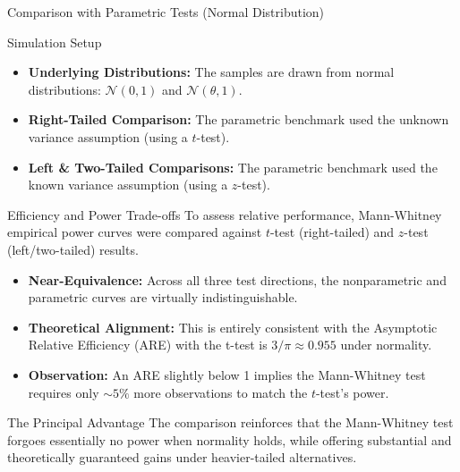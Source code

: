 \documentclass[8pt]{beamer}
\begin{document}
\begin{frame}{Comparison with Parametric Tests (Normal Distribution)}
    \footnotesize
    \begin{block}{Simulation Setup}
    \begin{itemize}
        \item \textbf{Underlying Distributions:} The samples are drawn from normal distributions: $\mathcal{N}(0, 1)$ and $\mathcal{N}(\theta, 1)$.
        \item \textbf{Right-Tailed Comparison:} The parametric benchmark used the unknown variance assumption (using a $t$-test).
        \item \textbf{Left \& Two-Tailed Comparisons:} The parametric benchmark used the known variance assumption (using a $z$-test).
    \end{itemize}
\end{block}
    \begin{block}{Efficiency and Power Trade-offs}
        To assess relative performance, Mann-Whitney empirical power curves were compared against $t$-test (right-tailed) and $z$-test (left/two-tailed) results.
        \begin{itemize}
            \item \textbf{Near-Equivalence:} Across all three test directions, the nonparametric and parametric curves are virtually indistinguishable.
            \item \textbf{Theoretical Alignment:} This is entirely consistent with the Asymptotic Relative Efficiency (ARE) with the t-test is $3/\pi \approx 0.955$ under normality.
            \item \textbf{Observation:} An ARE slightly below 1 implies the Mann-Whitney test requires only $\sim 5\%$ more observations to match the $t$-test's power.
        \end{itemize}
    \end{block}

    \begin{block}{The Principal Advantage}
        The comparison reinforces that the Mann-Whitney test forgoes essentially no power when normality holds, while offering substantial and theoretically guaranteed gains under heavier-tailed alternatives.
    \end{block}
\end{frame}
\end{document}
